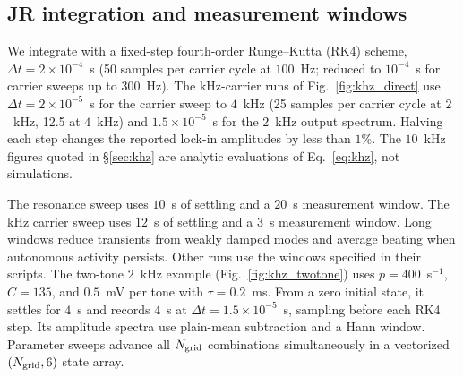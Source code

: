 \documentclass[11pt,a4paper]{article}
\begin{document}
\subsection{JR integration and measurement windows}\label{supp:jr-runs}
We integrate with a fixed-step fourth-order Runge--Kutta (RK4) scheme,
$\Delta t=2\times10^{-4}$~s (50 samples per carrier cycle at $100$~Hz; reduced to
$10^{-4}$~s for carrier sweeps up to $300$~Hz). The kHz-carrier runs of
Fig.~\ref{fig:khz_direct} use $\Delta t=2\times10^{-5}$~s for the carrier sweep to
$4$~kHz (25 samples per carrier cycle at $2$~kHz, 12.5 at $4$~kHz) and
$1.5\times10^{-5}$~s for the $2$~kHz output spectrum. Halving each step changes the
reported lock-in amplitudes by less than $1\%$. The $10$~kHz figures quoted in
\S\ref{sec:khz} are analytic evaluations of Eq.~\eqref{eq:khz}, not simulations.

The resonance sweep uses $10$~s of settling and a $20$~s
measurement window. The kHz carrier sweep uses $12$~s of settling and
a $3$~s measurement window. Long windows reduce transients from weakly damped modes and
average beating when autonomous activity persists. Other runs use the windows
specified in their scripts.
The two-tone $2$~kHz example (Fig.~\ref{fig:khz_twotone}) uses $p=400$~s$^{-1}$,
$C=135$, and $0.5$~mV per tone with $\tau=0.2$~ms. From a zero initial state,
it settles for $4$~s and records $4$~s at $\Delta t=1.5\times10^{-5}$~s,
sampling before each RK4 step. Its amplitude spectra use plain-mean subtraction
and a Hann window. Parameter sweeps advance all $N_{\rm grid}$ combinations simultaneously
in a vectorized $(N_{\rm grid},6)$ state array.

\fi
\end{document}
